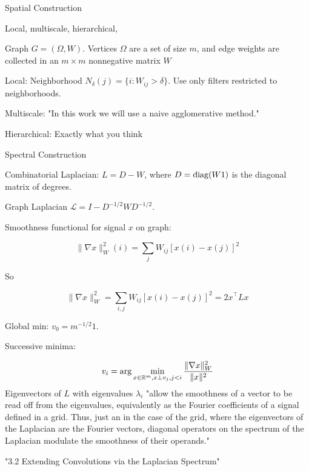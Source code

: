 \documentclass[english]{article}
\begin{document}
\item Spatial Construction

\bitem 

\item Local, multiscale, hierarchical,

\item Graph $G = (\Omega, W)$. Vertices $\Omega$ are a set of size $m$, and edge weights are collected in an  $m\times m$ nonnegative matrix  $W$

\item Local: Neighborhood $N_\delta(j) = \{i:W_{ij}>\delta\}$. Use only filters restricted to neighborhoods.

\item Multiscale: "In this work we will use a naive agglomerative method."

\item Hierarchical: Exactly what you think

\eitem 


\item Spectral Construction

\bitem 

\item Combinatorial Laplacian: $L = D-W$, where $D = \operatorname{diag}(W1)$ is the diagonal matrix of degrees. 

Graph Laplacian $\mathcal{L} = I-D^{-1/2}WD^{-1/2}$. 

\item Smoothness functional for signal $x$ on graph:

$$\|\nabla x\|_W^2(i) = \sum_j W_{ij} [x(i)-x(j)]^2$$

So 

$$\|\nabla x\|_W^2 
= \sum_{i,j} W_{ij} [x(i)-x(j)]^2
= 2x^\top L x
$$


\item Global min: $v_0 = m^{-1/2}1$.

Successive minima: 

$$v_i =\arg\min_{x\in\mathbb{R}^m, x\perp{v_j}, j<i} 
\frac{\|\nabla x\|_W^2}{\|x\|^2}
$$
Eigenvectors of $L$ with eigenvalues $\lambda_i$ "allow the smoothness of a vector to be read off
from the eigenvalues, equivalently as the Fourier coefficients of a signal defined
in a grid. Thus, just an in the case of the grid, where the eigenvectors of the Laplacian are the
Fourier vectors, diagonal operators on the spectrum of the Laplacian modulate the smoothness of
their operands."

\item "3.2 Extending Convolutions via the Laplacian Spectrum"
\end{document}
